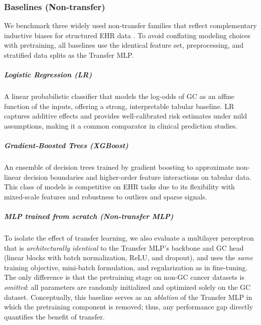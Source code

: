 \documentclass[diagnostics,article,submit,pdftex,moreauthors]{Definitions/mdpi}
\begin{document}
\subsubsection{Baselines (Non-transfer)}
We benchmark three widely used non-transfer families that reflect complementary inductive biases for structured EHR data \citep{EHRBreastRecurrence2023,WANG2023Prostate,park2024SHapley}. To avoid conflating modeling choices with pretraining, all baselines use the identical feature set, preprocessing, and stratified data splits as the Transfer MLP.

\subparagraph{Logistic Regression (LR)}
A linear probabilistic classifier that models the log-odds of GC as an affine function of the inputs, offering a strong, interpretable tabular baseline. LR captures additive effects and provides well-calibrated risk estimates under mild assumptions, making it a common comparator in clinical prediction studies.

\subparagraph{Gradient-Boosted Trees (XGBoost)}
An ensemble of decision trees trained by gradient boosting to approximate non-linear decision boundaries and higher-order feature interactions on tabular data. This class of models is competitive on EHR tasks due to its flexibility with mixed-scale features and robustness to outliers and sparse signals.

\subparagraph{MLP trained from scratch (Non-transfer MLP)}
To isolate the effect of transfer learning, we also evaluate a multilayer perceptron that is \emph{architecturally identical} to the Transfer MLP’s backbone and GC head (linear blocks with batch normalization, ReLU, and dropout), and uses the \emph{same} training objective, mini-batch formulation, and regularization as in fine-tuning. The only difference is that the pretraining stage on non-GC cancer datasets is \emph{omitted}: all parameters are randomly initialized and optimized solely on the GC dataset. Conceptually, this baseline serves as an \emph{ablation} of the Transfer MLP in which the pretraining component is removed; thus, any performance gap directly quantifies the benefit of transfer.
\end{document}
